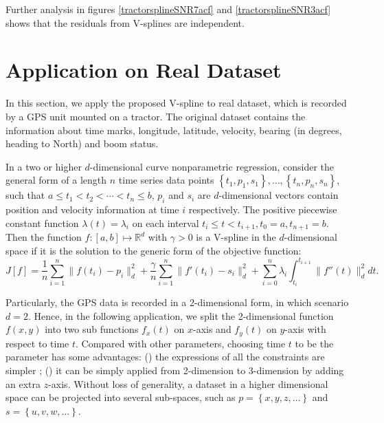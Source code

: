Further analysis in figures \ref{tractorsplineSNR7acf} and \ref{tractorsplineSNR3acf} shows that the residuals from V-splines are independent. 



\section{Application on Real Dataset}\label{splineapplication}

In this section, we apply the proposed V-spline to real dataset, which is recorded by a GPS unit mounted on a tractor. The original dataset contains the information about time marks, longitude, latitude, velocity, bearing (in degrees,  heading to North) and boom status. 

In a two or higher $d$-dimensional curve nonparametric regression, consider the general form of a length $n$ time series data points $\left\lbrace t_1,p_1,s_1\right\rbrace, \ldots, \left\lbrace t_n,p_n,s_n\right\rbrace$, such that $a \leq t_1<t_2< \cdots < t_n \leq b$, $p_i$ and $s_i$ are $d$-dimensional vectors contain position and velocity information at time $i$ respectively. The positive piecewise constant function $\lambda(t) = \lambda_i$ on each interval $t_i \leq t<t_{i+1}, t_0=a, t_{n+1}=b$.  Then the function $f:[a,b]\mapsto\mathbb{R}^d$ with $\gamma>0$ is a V-spline in the $d$-dimensional space if it is the solution to the generic form of the objective function: 
\begin{equation}\label{tractorsplineObjective2D}
J[f]= \frac{1}{n} \sum_{i=1}^{n} \lVert f(t_i)-p_i\rVert_d^2 + \frac{\gamma}{n} \sum_{i=1}^{n} \lVert f'(t_i)-s_i \rVert_d^2 +\sum_{i=0}^{n} \lambda_i\int_{t_i}^{t_{i+1}} \lVert f''(t)\rVert_d^2 dt. 
\end{equation}


Particularly, the GPS data is recorded in a 2-dimensional form, in which scenario $d=2$. Hence, in the following application, we split the 2-dimensional function $f(x,y)$ into two sub functions $f_x(t)$ on $x$-axis and $f_y(t)$ on $y$-axis with respect to time $t$. Compared with other parameters, choosing time $t$ to be the parameter has some advantages: () the expressions of all the constraints are simpler \citep{zhang2013cubic}; () it can be simply applied from 2-dimension to 3-dimension by adding an extra $z$-axis. Without loss of generality, a dataset in a higher dimensional space can be projected into several sub-spaces, such as $p=\left\lbrace x,y,z,\ldots \right\rbrace$ and $s=\left\lbrace u,v,w,\ldots \right\rbrace$. 


